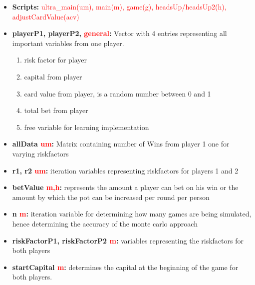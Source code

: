 \documentclass[11pt]{article}
\begin{document}
\begin{itemize}

\item	\textbf{Scripts:} \textcolor{red}{ultra\_main(um), main(m), game(g), headsUp/headsUp2(h), adjustCardValue(acv)} \\

\item	\textbf{playerP1, playerP2, \textcolor{red}{general}:} Vector with 4 entries representing all important variables from one player.
\begin{enumerate}
	\item risk factor for player
	\item capital from player
	\item card value from player, is a random number between 0 and 1
	\item total bet from player
	\item free variable for learning implementation
\end{enumerate}		
	
	
	
	
\item	\textbf{allData \textcolor{red}{um}:}  Matrix containing number of Wins from player 1 one for varying riskfactors\\
	
\item	\textbf{r1, r2 \textcolor{red}{um}:}  iteration variables representing riskfactors for players 1 and 2\\

\item	\textbf{betValue \textcolor{red}{m,h}:} represents the amount a player can bet on his win or the amount by which the pot can be increased per round per person \\

\item	\textbf{n \textcolor{red}{m}:}  iteration variable for determining how many games are being simulated, hence determining the accuracy of the monte carlo approach\\

\item	\textbf{riskFactorP1, riskFactorP2 \textcolor{red}{m}:}  variables representing the riskfactors for both players\\

\item	\textbf{startCapital \textcolor{red}{m}:} determines the capital at the beginning of the game for both players. \\


\end{itemize}
\end{document}

